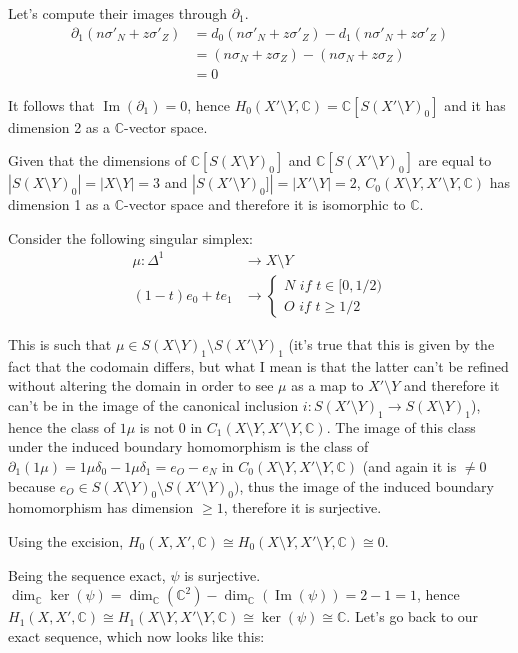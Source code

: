 \documentclass{article}
\newcommand{\numberset}{\mathbb}
\newcommand{\C}{\numberset{C}}
\DeclareMathOperator{\Ima}{Im}
\begin{document}
Let's compute their images through $\partial_1$.
\begin{align*}
		\partial_1(n\sigma'_N+z\sigma'_Z) & = d_0(n\sigma'_N+z\sigma'_Z)-d_1(n\sigma'_N+z\sigma'_Z) \\
		& = (n\sigma_N+z\sigma_Z)-(n\sigma_N+z\sigma_Z) \\
		& = 0
\end{align*}

It follows that $\Ima(\partial_1)=0$, hence $H_0(X'\setminus Y,\C)=\C[S(X'\setminus Y)_0]$ and it has dimension 2 as a $\C$-vector space.

Given that the dimensions of $\C[S(X\setminus Y)_0]$ and $\C[S(X'\setminus Y)_0]$ are equal to $|S(X\setminus Y)_0|=|X\setminus Y|=3$ and $|S(X'\setminus Y)_0]|=|X'\setminus Y|=2$, $C_0(X\setminus Y,X'\setminus Y,\C)$ has dimension 1 as a $\C$-vector space and therefore it is isomorphic to $\C$.

Consider the following singular simplex:
\begin{align*}
		\mu:\Delta^1 &\rightarrow X\setminus Y \\
		(1-t)e_0+te_1 &\rightarrow\begin{cases}
				N\textit{ if } t\in[0,1/2) \\
				O\textit{ if } t\ge 1/2
		\end{cases}
\end{align*}

This is such that $\mu\in S(X\setminus Y)_1\setminus S(X'\setminus Y)_1$ (it's true that this is given by the fact that the codomain differs, but what I mean is that the latter can't be refined without altering the domain in order to see $\mu$ as a map to $X'\setminus Y$ and therefore it can't be in the image of the canonical inclusion $i:S(X'\setminus Y)_1\rightarrow S(X\setminus Y)_1$), hence the class of $1\mu$ is not 0 in $C_1(X\setminus Y,X'\setminus Y,\C)$. The image of this class under the induced boundary homomorphism is the class of $\partial_1(1\mu)=1\mu\delta_0-1\mu\delta_1=e_O-e_N$ in $C_0(X\setminus Y,X'\setminus Y,\C)$ (and again it is $\neq 0$ because $e_O\in S(X\setminus Y)_0\setminus S(X'\setminus Y)_0)$, thus the image of the induced boundary homomorphism has dimension $\ge 1$, therefore it is surjective.

Using the excision, $H_0(X,X',\C)\cong H_0(X\setminus Y,X'\setminus Y,\C)\cong 0$.

Being the sequence exact, $\psi$ is surjective. $\dim_{\C}\ker(\psi)=\dim_{\C} (\C^2)-\dim_{\C}(\Ima(\psi))=2-1=1$, hence $H_1(X,X',\C)\cong H_1(X\setminus Y,X'\setminus Y,\C)\cong\ker(\psi)\cong\C$. Let's go back to our exact sequence, which now looks like this:
\end{document}
